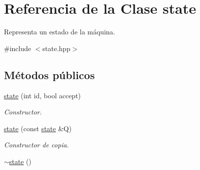 \hypertarget{classstate}{}\section{Referencia de la Clase state}
\label{classstate}


Representa un estado de la máquina.  




{\ttfamily \#include $<$state.\+hpp$>$}

\subsection*{Métodos públicos}
\begin{DoxyCompactItemize}
\item 
\hyperlink{classstate_a4a06c3b99fef0260bb8de5e8d8ba2d16}{state} (int id, bool accept)
\begin{DoxyCompactList}\small\item\em Constructor. \end{DoxyCompactList}\item 
\hypertarget{classstate_af2f12478890cae48ded72bf564f9d340}{}\hyperlink{classstate_af2f12478890cae48ded72bf564f9d340}{state} (const \hyperlink{classstate}{state} \&Q)\label{classstate_af2f12478890cae48ded72bf564f9d340}

\begin{DoxyCompactList}\small\item\em Constructor de copia. \end{DoxyCompactList}\item 
\hypertarget{classstate_a60216b51b01ca0ebe9786ec2da66568f}{}\hyperlink{classstate_a60216b51b01ca0ebe9786ec2da66568f}{$\sim$state} ()\label{classstate_a60216b51b01ca0ebe9786ec2da66568f}


\end{DoxyCompactItemize}
